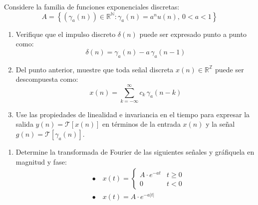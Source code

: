 \documentclass[
  11pt,
  letterpaper,
   addpoints,
   answers
  ]{exam}
\begin{document}
\begin{questions}
\question
Considere la familia de funciones exponenciales discretas:
\begin{equation}
  A = \left\{ (\gamma_a(n)) \in \mathbb{R}^{\mathbb{N}} : \gamma_a(n) = a^n u(n),\ 0 < a < 1 \right\}
\end{equation}
\begin{enumerate}
  \item Verifique que el impulso discreto $\delta(n)$ puede ser expresado punto a punto como:
  \begin{equation}
    \delta(n) = \gamma_a(n) - a\,\gamma_a(n-1)
  \end{equation}
  \item Del punto anterior, muestre que toda señal discreta $x(n) \in \mathbb{R}^{\mathbb{Z}}$ puede ser descompuesta como:
  \begin{equation}
    x(n) = \sum_{k=-\infty}^{\infty} c_k\,\gamma_a(n-k)
  \end{equation}
  \item Use las propiedades de linealidad e invariancia en el tiempo para expresar la salida $y(n) = \mathcal{T}[x(n)]$ en términos de la entrada $x(n)$ y la señal $g(n) = \mathcal{T}[\gamma_a(n)]$.
\end{enumerate}
\question
\begin{enumerate}
  \item Determine la transformada de Fourier de las siguientes señales y gráfiquela en magnitud y fase:
\begin{align*}
  &\bullet\quad x(t) = \begin{cases}
    A \cdot e^{-a t} & t \geq 0 \\
    0 & t < 0
  \end{cases} \\
  &\bullet\quad x(t) = A \cdot e^{-a|t|}
\end{align*}


\end{enumerate}
\end{questions}
\end{document}
